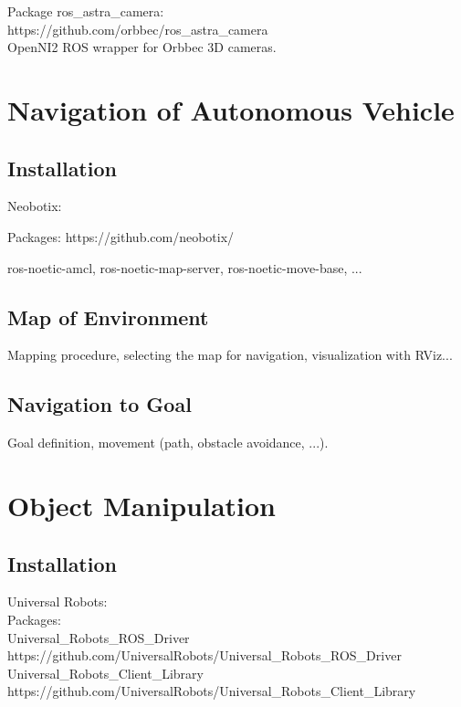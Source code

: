  Package ros\_astra\_camera:\\
 https://github.com/orbbec/ros\_astra\_camera\\
 OpenNI2 ROS wrapper for Orbbec 3D cameras.\\



\section{Navigation of Autonomous Vehicle}

\subsection{Installation}
Neobotix:

Packages:
https://github.com/neobotix/

ros-noetic-amcl, ros-noetic-map-server, ros-noetic-move-base, ...

\subsection{Map of Environment}
Mapping procedure, selecting the map for navigation, visualization with RViz...\\

\subsection{Navigation to Goal}
Goal definition, movement (path, obstacle avoidance, ...).

\section{Object Manipulation}


\subsection{Installation}
Universal Robots:\\

Packages:\\
Universal\_Robots\_ROS\_Driver
https://github.com/UniversalRobots/Universal\_Robots\_ROS\_Driver\\

Universal\_Robots\_Client\_Library\\
https://github.com/UniversalRobots/Universal\_Robots\_Client\_Library\\

